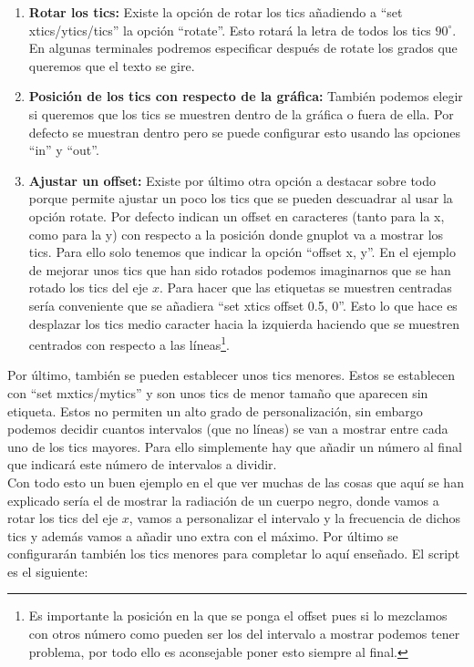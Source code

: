 \documentclass[11pt,a4paper,twoside,pdf]{article}
\numberwithin{equation}{section}
\begin{document}
\begin{enumerate}
	\item \textbf{Rotar los tics:} Existe la opción de rotar los tics añadiendo a ``set xtics/ytics/tics'' la opción ``rotate''. Esto rotará la letra de todos los tics $90^{\circ}$. En algunas terminales podremos especificar después de rotate los grados que queremos que el texto se gire.
	\item \textbf{Posición de los tics con respecto de la gráfica:} También podemos elegir si queremos que los tics se muestren dentro de la gráfica o fuera de ella. Por defecto se muestran dentro pero se puede configurar esto usando las opciones ``in'' y ``out''.
	\item \textbf{Ajustar un offset:} Existe por último otra opción a destacar sobre todo porque permite ajustar un poco los tics que se pueden descuadrar al usar la opción rotate. Por defecto indican un offset en caracteres (tanto para la x, como para la y) con respecto a la posición donde gnuplot va a mostrar los tics. Para ello solo tenemos que indicar la opción ``offset x, y''. En el ejemplo de mejorar unos tics que han sido rotados podemos imaginarnos que se han rotado los tics del eje $x$. Para hacer que las etiquetas se muestren centradas sería conveniente que se añadiera ``set xtics offset 0.5, 0''. Esto lo que hace es desplazar los tics medio caracter hacia la izquierda haciendo que se muestren centrados con respecto a las líneas\footnote{Es importante la posición en la que se ponga el offset pues si lo mezclamos con otros número como pueden ser los del intervalo a mostrar podemos tener problema, por todo ello es aconsejable poner esto siempre al final.}.
\end{enumerate}

Por último, también se pueden establecer unos tics menores. Estos se establecen con ``set mxtics/mytics'' y son unos tics de menor tamaño que aparecen sin etiqueta. Estos no permiten un alto grado de personalización, sin embargo podemos decidir cuantos intervalos (que no líneas) se van a mostrar entre cada uno de los tics mayores. Para ello simplemente hay que añadir un número al final que indicará este número de intervalos a dividir.\\

Con todo esto un buen ejemplo en el que ver muchas de las cosas que aquí se han explicado sería el de mostrar la radiación de un cuerpo negro, donde vamos a rotar los tics del eje $x$, vamos a personalizar el intervalo y la frecuencia de dichos tics y además vamos a añadir uno extra con el máximo. Por último se configurarán también los tics menores para completar lo aquí enseñado. El script es el siguiente:
\end{document}
